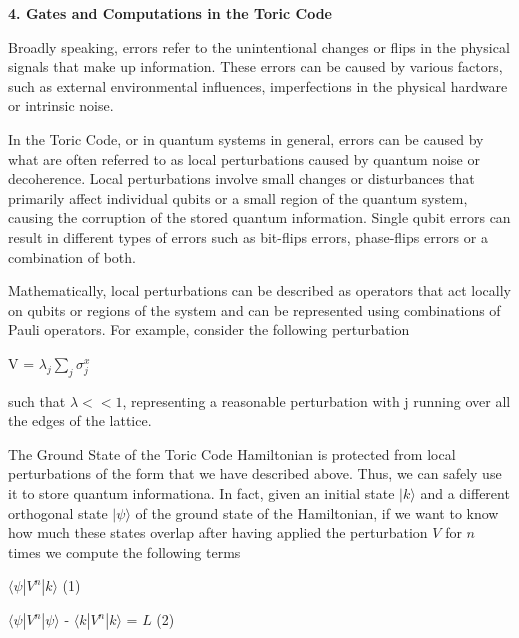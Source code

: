 \documentclass[12pt]{report}
\begin{document}
	
	\begin{minipage}{1 \textwidth}
		
		
		\textbf{4. Gates and Computations in the Toric Code}\newline 
		
		Broadly speaking, errors refer to the unintentional changes or flips in the physical signals that make up information. These errors can be caused by various factors, such as external environmental influences, imperfections in the physical hardware or intrinsic noise. \newline
		
		In the Toric Code, or in quantum systems in general, errors can be caused by what are often referred to as local perturbations caused by quantum noise or decoherence. Local perturbations involve small changes or disturbances that primarily affect individual qubits or a small region of the quantum system, causing the corruption of the stored quantum information. Single qubit errors can result in different types of errors such as bit-flips errors, phase-flips errors or a combination of both. \newline
		
		Mathematically, local perturbations can be described as operators that act locally on qubits or regions of the system and can be represented using combinations of Pauli operators. For example, consider the following perturbation
		
		\begin{center}
			V = $\lambda_j \sum_{j} \sigma^x_j $
		\end{center}
		
		such that $\lambda << 1 $, representing a reasonable perturbation with j running over all the edges of the lattice. \newline
		
		The Ground State of the Toric Code Hamiltonian is protected from local perturbations of the form that we have described above. Thus, we can safely use it to store quantum informationa. In fact, given an initial state $ |k \rangle $ and  a different orthogonal state $ |\psi \rangle $ of the ground state of the Hamiltonian, if we want to know how much these states overlap after having applied the perturbation $V$ for $n$ times we compute the following terms\newline
		
		\begin{center}
			$ \langle \psi|V^n| k \rangle$                                          (1)
		\end{center}
		\begin{center}
			 $ \langle \psi|V^n| \psi \rangle$ - $ \langle k|V^n| k \rangle$ = $L$  (2)
		\end{center}
		

\end{minipage}
\end{document}
